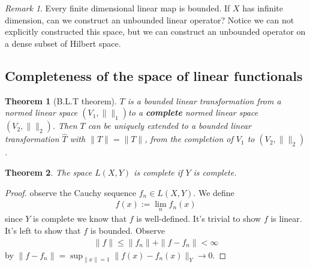 \documentclass[a4paper,11pt,fleqn]{book}
\newtheorem{theorem}{Theorem}[section]
\theoremstyle{definition}
\theoremstyle{remark}
\newtheorem*{remark}{Remark}
\begin{document}
\begin{remark}
Every finite dimensional linear map is bounded. If $X$ has infinite dimension, can we construct an unbounded linear operator? Notice we can not explicitly constructed this space, but we can construct an unbounded operator on a dense subset of Hilbert space.  	
\end{remark}



\subsection{Completeness of the space of linear functionals}
\begin{theorem}[B.L.T theorem]
	$T$ is a bounded linear transformation from a normed linear space $( V_1, \| \|_1 )$to a \textbf{complete} normed linear space $(V_2, \| \|_2 )$. Then $T$ can be uniquely extended to a bounded linear transformation  $\hat{T}$ with $\|\hat{T}\| = \|T\|$, from the completion of $V_1$ to $(V_2, \|\|_2)$.  
\end{theorem}

\begin{theorem}
	The space $L(X, Y)$ is complete if $Y$ is complete. 
\end{theorem}
\begin{proof}
	observe the Cauchy sequence $f_n \in L(X,Y)$. We define 
	\begin{align*}
		f(x):= \lim_n f_n(x)
	\end{align*}
	since $Y$ is complete we know that $f$ is well-defined. It's trivial to show $f$ is linear. It's left to show that $f$ is bounded. Observe
	\begin{align*}
		\|f\| \le \|f_n\| + \|f - f_n\|< \infty
	\end{align*}
	by $\|f - f_n\| = \sup_{\|x\| = 1} \|f(x) - f_n(x)\|_Y \rightarrow 0$.
\end{proof}
\end{document}
